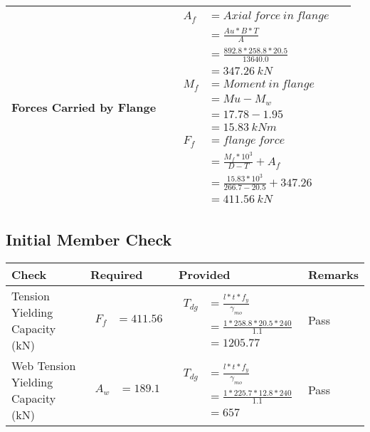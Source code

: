 \documentclass{article}%
\begin{document}
\begin{longtable}{|p{4cm}|p{3.5cm}|p{6.5cm}|p{1.5cm}|}
\hline%
Forces Carried by Flange&&$\begin{aligned} A_f&= Axial~force~ in ~flange  \\ &= \frac{Au * B *T}{A} \\ &= \frac{892.8 * 258.8*20.5}{13640.0} \\ &=347.26~ kN\\ M_f& =Moment~ in~ flange \\  & = Mu-M_w\\ &= 17.78-1.95\\ &=15.83~{kNm}\\  F_f& =flange~force  \\ & = \frac{M_f *10^3}{D-T} + A_f \\ &= \frac{15.83* 10^3}{266.7-20.5} +347.26 \\ &=411.56~kN \end{aligned}$&\\%
\hline%
\end{longtable}

%
\newpage%
\subsection{Initial Member Check}%
\label{subsec:InitialMemberCheck}%
\renewcommand{\arraystretch}{1.2}%
\begin{longtable}{|p{3cm}|p{4.5cm}|p{6.5cm}|p{1.5cm}|}%
\hline%
\rowcolor{OsdagGreen}%
Check&Required&Provided&Remarks\\%
\hline%
\endhead%
\hline%
Tension Yielding Capacity (kN)&$\begin{aligned} F_f &=411.56\end{aligned}$&$\begin{aligned} T_{dg} &= \frac{l*t*f_y}{\gamma_{mo}}\\ &=\frac{1*258.8*20.5*240}{1.1}\\ &=1205.77\end{aligned}$&Pass\\%
\hline%
Web Tension Yielding Capacity (kN)&$\begin{aligned} A_w &=189.1\end{aligned}$&$\begin{aligned} T_{dg} &= \frac{l*t*f_y}{\gamma_{mo}}\\ &=\frac{1*225.7*12.8*240}{1.1}\\ &=657\end{aligned}$&Pass\\%
\hline%
\end{longtable}
\end{document}
